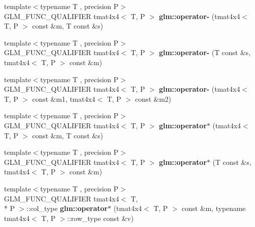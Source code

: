 \begin{DoxyCompactItemize}
\item 
\hypertarget{namespaceglm_a663ddfcf136f3a13694686bb0697bbde}{{\footnotesize template$<$typename T , precision P$>$ }\\G\-L\-M\-\_\-\-F\-U\-N\-C\-\_\-\-Q\-U\-A\-L\-I\-F\-I\-E\-R tmat4x4$<$ T, P $>$ {\bfseries glm\-::operator-\/} (tmat4x4$<$ T, P $>$ const \&m, T const \&s)}\label{namespaceglm_a663ddfcf136f3a13694686bb0697bbde}

\item 
\hypertarget{namespaceglm_a24aba4a4b8f93adbdc8e6d301d713141}{{\footnotesize template$<$typename T , precision P$>$ }\\G\-L\-M\-\_\-\-F\-U\-N\-C\-\_\-\-Q\-U\-A\-L\-I\-F\-I\-E\-R tmat4x4$<$ T, P $>$ {\bfseries glm\-::operator-\/} (T const \&s, tmat4x4$<$ T, P $>$ const \&m)}\label{namespaceglm_a24aba4a4b8f93adbdc8e6d301d713141}

\item 
\hypertarget{namespaceglm_a0533c5ac15cb344bc9a67803717c5300}{{\footnotesize template$<$typename T , precision P$>$ }\\G\-L\-M\-\_\-\-F\-U\-N\-C\-\_\-\-Q\-U\-A\-L\-I\-F\-I\-E\-R tmat4x4$<$ T, P $>$ {\bfseries glm\-::operator-\/} (tmat4x4$<$ T, P $>$ const \&m1, tmat4x4$<$ T, P $>$ const \&m2)}\label{namespaceglm_a0533c5ac15cb344bc9a67803717c5300}

\item 
\hypertarget{namespaceglm_a60a8cd46716e5c76a3011578444ffef7}{{\footnotesize template$<$typename T , precision P$>$ }\\G\-L\-M\-\_\-\-F\-U\-N\-C\-\_\-\-Q\-U\-A\-L\-I\-F\-I\-E\-R tmat4x4$<$ T, P $>$ {\bfseries glm\-::operator$\ast$} (tmat4x4$<$ T, P $>$ const \&m, T const \&s)}\label{namespaceglm_a60a8cd46716e5c76a3011578444ffef7}

\item 
\hypertarget{namespaceglm_a227858cfdb144f8e65ba256f4f1797a8}{{\footnotesize template$<$typename T , precision P$>$ }\\G\-L\-M\-\_\-\-F\-U\-N\-C\-\_\-\-Q\-U\-A\-L\-I\-F\-I\-E\-R tmat4x4$<$ T, P $>$ {\bfseries glm\-::operator$\ast$} (T const \&s, tmat4x4$<$ T, P $>$ const \&m)}\label{namespaceglm_a227858cfdb144f8e65ba256f4f1797a8}

\item 
\hypertarget{namespaceglm_adbbcb07514e6d44aad7e6f40e80e8c99}{{\footnotesize template$<$typename T , precision P$>$ }\\G\-L\-M\-\_\-\-F\-U\-N\-C\-\_\-\-Q\-U\-A\-L\-I\-F\-I\-E\-R tmat4x4$<$ T, \\*
P $>$\-::col\-\_\-type {\bfseries glm\-::operator$\ast$} (tmat4x4$<$ T, P $>$ const \&m, typename tmat4x4$<$ T, P $>$\-::row\-\_\-type const \&v)}\label{namespaceglm_adbbcb07514e6d44aad7e6f40e80e8c99}


\end{DoxyCompactItemize}

